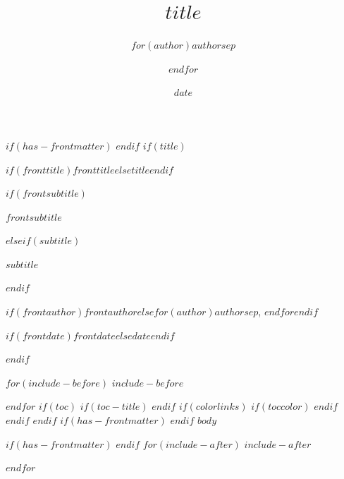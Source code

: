 \documentclass[
$for(babel-otherlangs)$
  $babel-otherlangs$,
$endfor$
$if(babel-lang)$
  $babel-lang$,
$endif$
$if(fontsize)$
  $fontsize$,
$endif$
$if(papersize)$
  $papersize$paper,
$endif$
$for(classoption)$
  $classoption$$sep$,
$endfor$
]{$documentclass$}
\title{$title$}
\author{$for(author)$$author$$sep$ \and $endfor$}
\date{$date$}
\renewcommand{\maketitle}{%
  \begin{titlepage}%
    \pagecolor{posterbg}%
    \color{posterfg}%
    \thispagestyle{empty}%
    \raggedright
    \vspace*{0.10\paperheight}
    {\fontsize{56pt}{56pt}\selectfont\bfseries $if(fronttitle)$$fronttitle$$else$$title$$endif$ \par}
$if(frontsubtitle)$
    \vspace{12pt}
    {\fontsize{18pt}{22pt}\selectfont $frontsubtitle$ \par}
$elseif(subtitle)$
    \vspace{12pt}
    {\fontsize{18pt}{22pt}\selectfont $subtitle$ \par}
$endif$
    \vfill
    {\fontsize{12pt}{14pt}\selectfont $if(frontauthor)$$frontauthor$$else$$for(author)$$author$$sep$, $endfor$$endif$ \par}
    {\fontsize{11pt}{13pt}\selectfont $if(frontdate)$$frontdate$$else$$date$$endif$ \par}
  \end{titlepage}%
  \nopagecolor
  \color{ink}%
}
\begin{document}
$if(has-frontmatter)$
\frontmatter
$endif$
$if(title)$
\maketitle
$endif$

$for(include-before)$
$include-before$

$endfor$
$if(toc)$
$if(toc-title)$
\renewcommand*\contentsname{$toc-title$}
$endif$
{
$if(colorlinks)$
$if(toccolor)$
\hypersetup{linkcolor=$toccolor$}
$endif$
$endif$
\setcounter{tocdepth}{$toc-depth$}
\tableofcontents
}
$endif$
$if(has-frontmatter)$
\mainmatter
$endif$
$body$

$if(has-frontmatter)$
\backmatter
$endif$
$for(include-after)$
$include-after$

$endfor$
\end{document}
